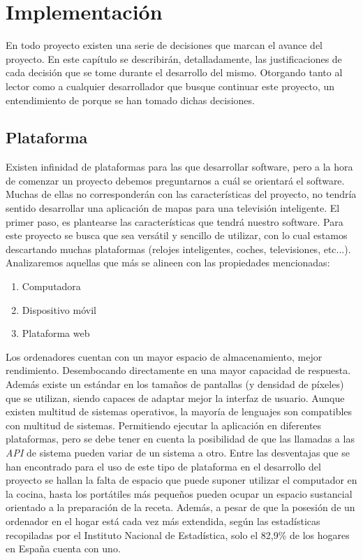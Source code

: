 \chapter{Implementación}
En todo proyecto existen una serie de decisiones que marcan el avance del proyecto. En este capítulo se describirán, detalladamente, las justificaciones de cada decisión que se tome durante el desarrollo del mismo. Otorgando tanto al lector como a cualquier desarrollador que busque continuar este proyecto, un entendimiento de porque se han tomado dichas decisiones.

\section{Plataforma}
Existen infinidad de plataformas para las que desarrollar software, pero a la hora de comenzar un proyecto debemos preguntarnos a cuál se orientará el software. Muchas de ellas no corresponderán con las características del proyecto, no tendría sentido desarrollar una aplicación de mapas para una televisión inteligente. 
El primer paso, es plantearse las características que tendrá nuestro software. Para este proyecto se busca que sea versátil y sencillo de utilizar, con lo cual estamos descartando muchas plataformas (relojes inteligentes, coches, televisiones, etc...). Analizaremos aquellas que más se alineen con las propiedades mencionadas: 
\begin{enumerate}
    \item Computadora
    \item Dispositivo móvil
    \item Plataforma web
\end{enumerate}
Los ordenadores cuentan con un mayor espacio de almacenamiento, mejor rendimiento. Desembocando directamente en una mayor capacidad de respuesta. Además existe un estándar en los tamaños de pantallas (y densidad de píxeles) que se utilizan, siendo capaces de adaptar mejor la interfaz de usuario. Aunque existen multitud de sistemas operativos, la mayoría de lenguajes son compatibles con multitud de sistemas. Permitiendo ejecutar la aplicación en diferentes plataformas, pero se debe tener en cuenta la posibilidad de que las llamadas a las \emph{API} de sistema pueden variar de un sistema a otro. Entre las desventajas que se han encontrado para el uso de este tipo de plataforma en el desarrollo del proyecto se hallan la falta de espacio que puede suponer utilizar el computador en la cocina, hasta los portátiles más pequeños pueden ocupar un espacio sustancial orientado a la preparación de la receta. Además, a pesar de que la posesión de un ordenador en el hogar está cada vez más extendida, según las estadísticas recopiladas por el Instituto Nacional de Estadística, solo el 82,9\% de los hogares en España cuenta con uno.

